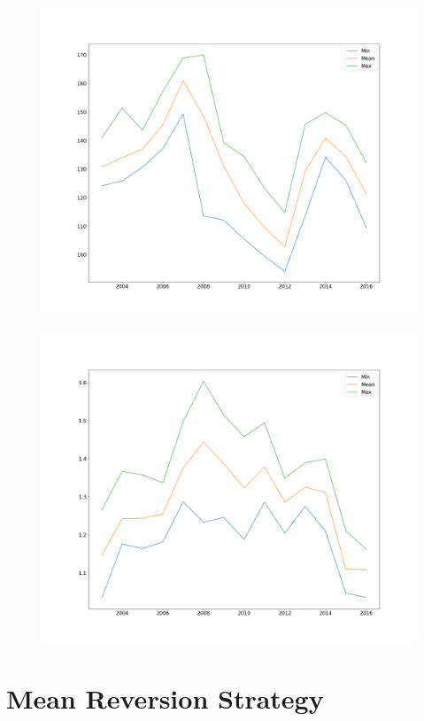 \documentclass[a4paper]{article}
\begin{document}
\begin{figure}
\begin{minipage}{.5\textwidth}
	\centering
	\includegraphics[width=\linewidth]{Figures/stats_jpy}
	\label{fig:5}
	\end{minipage}%
	\begin{minipage}{.5\textwidth}
	\centering
	\includegraphics[width=\linewidth]{Figures/stats_usd}
	\label{fig:6}
	\end{minipage}
\end{figure}


\section{Mean Reversion Strategy}
\end{document}
